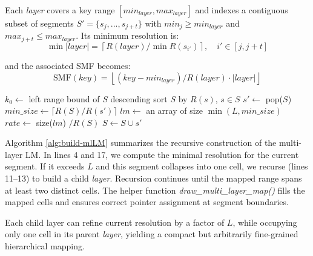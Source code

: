 Each \textit{layer} covers a key range $[min_{layer}, max_{layer}]$ and indexes a contiguous subset of segments $S' = \{s_j, ..., s_{j+t}\}$ with $min_j \ge min_{layer}$ and $max_{j+t} \le max_{layer}$. Its minimum resolution is:
$$
\min|layer| = \left\lceil R(layer) /\min R(s_{i'}) \right\rceil, \quad i' \in [j, j+t]
$$

and the associated SMF becomes:
$$
\text{SMF}(key) = \left\lfloor (key - min_{layer}) / R(layer) \cdot |layer| \right\rfloor
$$

\begin{algorithm}[h]
  \caption{BuildMultiLayerLM}
  \label{alg:build-mlLM}
  \small 
  $k_0 \gets$ left range bound of $S$\;
  descending sort $S$ by $R(s)$, $s \in S$\;
  $s' \gets$ pop($S$)\;
  $min\_size \gets \lceil R(S) / R(s') \rceil$\;
  $lm \gets$ an array of size $\min(\mathit{L}, min\_size)$\;
  $rate \gets$ size($lm$) $/ R(S)$\;
  $S \gets S \cup s'$\;
\end{algorithm}

Algorithm \ref{alg:build-mlLM} summarizes the recursive construction of the multi-layer LM. In lines 4 and 17, we compute the minimal resolution for the current segment. If it exceeds $\mathit{L}$ and this segment collapses into one cell, we recurse (lines 11–13) to build a child \textit{layer}. Recursion continues until the mapped range spans at least two distinct cells. The helper function \textit{draw\_multi\_layer\_map()} fills the mapped cells and ensures correct pointer assignment at segment boundaries.

Each child layer can refine current resolution by a factor of $\mathit{L}$, while occupying only one cell in its parent \textit{layer}, yielding a compact but arbitrarily fine-grained hierarchical mapping.

